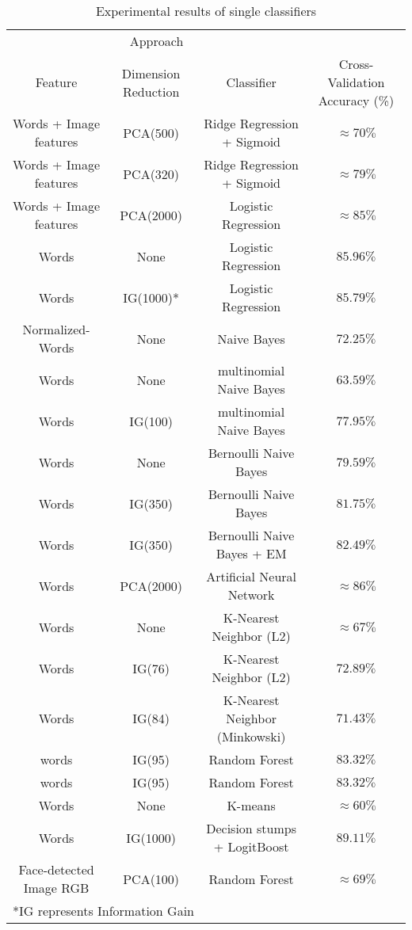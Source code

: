 \begin{table}[h!]
\centering
\begin{tabular*}{\textwidth}{c @{\extracolsep{\fill}}ccc}
\hline
\multicolumn{3}{c}{Approach} \\
\cline{1-3}
Feature & Dimension Reduction & Classifier & Cross-Validation Accuracy (\%) \\
\hline
Words + Image features & PCA(500) & Ridge Regression + Sigmoid & $\approx 70\%$\\
Words + Image features & PCA(320) & Ridge Regression + Sigmoid & $\approx 79\%$ \\
Words + Image features & PCA(2000) & Logistic Regression & $\approx 85\%$ \\
Words & None & Logistic Regression & $ 85.96\%$ \\
Words & IG(1000)* & Logistic Regression & $ 85.79\%$ \\
Normalized-Words & None & Naive Bayes & $72.25\%$ \\
Words & None & multinomial Naive Bayes & $ 63.59\%$ \\
Words & IG(100) & multinomial Naive Bayes & $ 77.95\%$ \\
Words & None & Bernoulli Naive Bayes & $ 79.59\%$ \\
Words & IG(350) & Bernoulli Naive Bayes & $ 81.75\%$ \\
Words & IG(350) & Bernoulli Naive Bayes + EM & $ 82.49\%$ \\
Words & PCA(2000) & Artificial Neural Network & $ \approx 86\%$ \\
Words & None & K-Nearest Neighbor (L2) & $ \approx 67\%$ \\
Words & IG(76) & K-Nearest Neighbor (L2) & $ 72.89\%$ \\
Words & IG(84) & K-Nearest Neighbor (Minkowski)  & $ 71.43\%$ \\
words & IG(95) & Random Forest & $83.32\%$ \\
words & IG(95) & Random Forest & $83.32\%$ \\
Words & None & K-means & $ \approx 60\%$\\
Words & IG(1000) & Decision stumps + LogitBoost& $89.11\%$\\
Face-detected Image RGB & PCA(100) & Random Forest & $\approx 69\%$ \\
\hline
\multicolumn{4}{l}{*IG represents Information Gain} \\
\hline
\end{tabular*}
\caption{Experimental results of single classifiers}
\label{Table 1}
\end{table}

